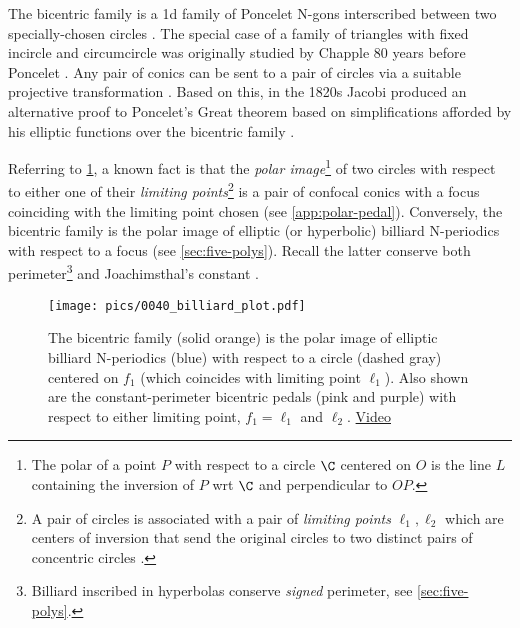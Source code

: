 The bicentric family is a 1d family of Poncelet N-gons interscribed between two specially-chosen circles \cite[Poncelet's Porism]{mw}. The special case of a family of triangles with fixed incircle and circumcircle was originally studied by Chapple 80 years before Poncelet \cite{odehnal2011-poristic}. Any pair of conics can be sent to a pair of circles via a suitable projective transformation \cite{akopyan2007-conics}. Based on this, in the 1820s Jacobi produced an alternative proof to Poncelet's Great theorem based on simplifications afforded by his elliptic functions over the bicentric family \cite{bos-1987,dragovic11,nash2018-poncelet}.

Referring to
\cref{fig:confocal}, a known fact is that the {\em polar image}\footnote{The polar of a point $P$ with respect to a circle $\C$ centered on $O$ is the line $L$ containing the inversion of $P$ wrt $\C$ and perpendicular to $OP$.} of two circles with respect to either one of their {\em limiting points}\footnote{A pair of circles is associated with a pair of {\em limiting points} $\ell_1,\ell_2$ which are centers of inversion that send the original circles to two distinct pairs of concentric circles \cite[Limiting Points]{mw}.} is a pair of confocal conics with a focus coinciding with the limiting point chosen \cite{akopyan2007-conics} (see \cref{app:polar-pedal}). Conversely, the bicentric family is the polar image of elliptic (or hyperbolic) billiard N-periodics with respect to a focus (see \cref{sec:five-polys}). Recall the latter conserve both perimeter\footnote{Billiard inscribed in hyperbolas conserve {\em signed} perimeter, see \cref{sec:five-polys}.} and Joachimsthal's constant \cite{sergei91}.

\begin{figure}
    \centering
    \texttt{[image: pics/0040\_billiard\_plot.pdf]}
    \caption{The bicentric family  (solid orange) is the polar image of elliptic billiard N-periodics (blue) with respect to a circle (dashed gray) centered on $f_1$ (which coincides with limiting point $\ell_1$). Also shown are the constant-perimeter bicentric pedals (pink and purple) with respect to either limiting point, $f_1=\ell_1$ and $\ell_2$.  \href{https://youtu.be/8m21fCz8eX4}{Video}}
    \label{fig:confocal}
\end{figure}


